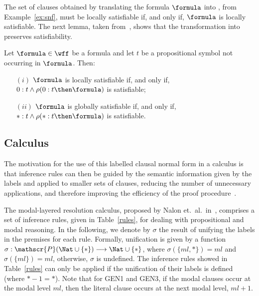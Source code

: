 The set of clauses obtained by translating the formula $\formula$ into
, from Example~\ref{ex:snf}, must be locally satisfiable if, and only
if, $\formula$ is locally satisfiable. The next lemma, taken
from~\cite{nalon2015modal}, shows that the transformation into 
preserves satisfiability.

\begin{lemma}
    Let $\formula \in \wff$ be a formula and let $t$ be a propositional symbol
    not occurring in $\formula$. Then: 
    \begin{enumerate}
        \item[$(i)$] $\formula$ is locally satisfiable if, and only if, $0 : t \land \rho(0 : t \then \formula)$ is satisfiable;
        \item[$(ii)$] $\formula$ is globally satisfiable if, and only if, $* : t \land \rho(* : t \then \formula)$ is satisfiable.
    \end{enumerate}
\end{lemma}

\subsection{Calculus}

The motivation for the use of this labelled clausal normal form in a calculus is
that inference rules can then be guided by the semantic information given by the
labels and applied to smaller sets of clauses, reducing the number of
unnecessary applications, and therefore improving the efficiency of the proof
procedure~\cite{Nalon2016}. 

The modal-layered resolution calculus, proposed by Nalon et.\ al.\
in~\cite{nalon2015modal}, comprises a set of inference rules, given in
Table~\ref{rules}, for dealing with propositional and modal reasoning. In the
following, we denote by $\sigma$ the result of unifying the labels in the
premises for each rule.  Formally, unification is given by a function $ \sigma :
\mathscr{P}(\Nat \cup \{*\}) \longrightarrow \Nat \cup \{*\}$, where $\sigma
(\{ml, *\}) = ml$ and $\sigma (\{ml\}) = ml$, otherwise, $\sigma$ is undefined.
The inference rules showed in Table~\ref{rules} can only be applied if the
unification of their labels is defined (where $* - 1 = *$). Note that for GEN1
and GEN3, if the modal clauses occur at the modal level $ml$, then the literal
clause occurs at the next modal level, $ml + 1$.

